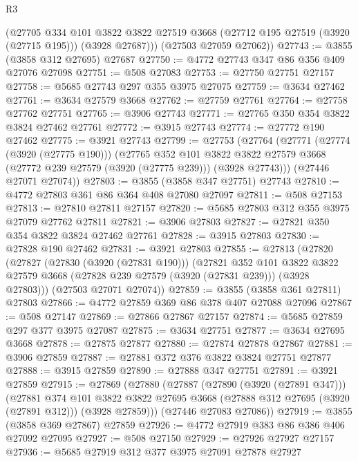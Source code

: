 \begin{lexlean}{R3}
\begin{coremodule}
        (@27705
          @334
          @101
          @3822
          @3822
          @27519
          @3668
          (@27712 @195 @27519 (@3920 (@27715 @195)))
          (@3928 @27687)))
      (@27503 @27059 @27062))
@27743 := @3855 (@3858 @312 @27695) @27687
@27750 := @4772 @27743 @347 @86 @356 @409 @27076 @27098
@27751 := @508 @27083
@27753 := @27750 @27751 @27157
@27758 := @5685 @27743 @297 @355 @3975 @27075
@27759 := @3634 @27462
@27761 := @3634 @27579 @3668
@27762 := @27759 @27761
@27764 := @27758 @27762 @27751
@27765 := @3906 @27743
@27771 := @27765 @350 @354 @3822 @3824 @27462 @27761
@27772 := @3915 @27743
@27774 := @27772 @190 @27462
@27775 := @3921 @27743
@27799 := @27753
    (@27764
      (@27771
        (@27774 (@3920 (@27775 @190)))
        (@27765
          @352
          @101
          @3822
          @3822
          @27579
          @3668
          (@27772 @239 @27579 (@3920 (@27775 @239)))
          (@3928 @27743)))
      (@27446 @27071 @27074))
@27803 := @3855 (@3858 @347 @27751) @27743
@27810 := @4772 @27803 @361 @86 @364 @408 @27080 @27097
@27811 := @508 @27153
@27813 := @27810 @27811 @27157
@27820 := @5685 @27803 @312 @355 @3975 @27079 @27762 @27811
@27821 := @3906 @27803
@27827 := @27821 @350 @354 @3822 @3824 @27462 @27761
@27828 := @3915 @27803
@27830 := @27828 @190 @27462
@27831 := @3921 @27803
@27855 := @27813
    (@27820
      (@27827
        (@27830 (@3920 (@27831 @190)))
        (@27821
          @352
          @101
          @3822
          @3822
          @27579
          @3668
          (@27828 @239 @27579 (@3920 (@27831 @239)))
          (@3928 @27803)))
      (@27503 @27071 @27074))
@27859 := @3855 (@3858 @361 @27811) @27803
@27866 := @4772 @27859 @369 @86 @378 @407 @27088 @27096
@27867 := @508 @27147
@27869 := @27866 @27867 @27157
@27874 := @5685 @27859 @297 @377 @3975 @27087
@27875 := @3634 @27751
@27877 := @3634 @27695 @3668
@27878 := @27875 @27877
@27880 := @27874 @27878 @27867
@27881 := @3906 @27859
@27887 := @27881 @372 @376 @3822 @3824 @27751 @27877
@27888 := @3915 @27859
@27890 := @27888 @347 @27751
@27891 := @3921 @27859
@27915 := @27869
    (@27880
      (@27887
        (@27890 (@3920 (@27891 @347)))
        (@27881
          @374
          @101
          @3822
          @3822
          @27695
          @3668
          (@27888 @312 @27695 (@3920 (@27891 @312)))
          (@3928 @27859)))
      (@27446 @27083 @27086))
@27919 := @3855 (@3858 @369 @27867) @27859
@27926 := @4772 @27919 @383 @86 @386 @406 @27092 @27095
@27927 := @508 @27150
@27929 := @27926 @27927 @27157
@27936 := @5685 @27919 @312 @377 @3975 @27091 @27878 @27927

\end{coremodule}
\end{lexlean}
